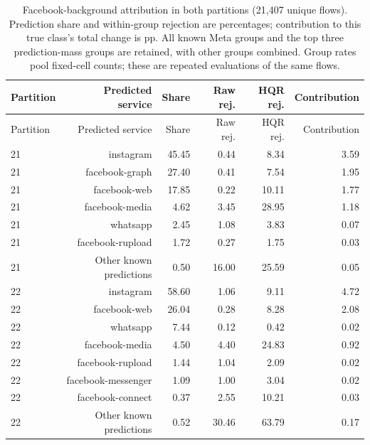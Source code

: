 \begingroup\small\setlength{\tabcolsep}{3pt}
\begin{longtable}{lrrrrr}
\caption{Facebook-background attribution in both partitions (21,407 unique flows). Prediction share and within-group rejection are percentages; contribution to this true class's total change is pp. All known Meta groups and the top three prediction-mass groups are retained, with other groups combined. Group rates pool fixed-cell counts; these are repeated evaluations of the same flows.}\label{tab:final-facebook}\\
\toprule
Partition & Predicted service & Share & Raw rej. & HQR rej. & Contribution\\
\midrule
\endfirsthead
\toprule
Partition & Predicted service & Share & Raw rej. & HQR rej. & Contribution\\
\midrule
\endhead
21 & instagram & 45.45 & 0.44 & 8.34 & 3.59\\
21 & facebook-graph & 27.40 & 0.41 & 7.54 & 1.95\\
21 & facebook-web & 17.85 & 0.22 & 10.11 & 1.77\\
21 & facebook-media & 4.62 & 3.45 & 28.95 & 1.18\\
21 & whatsapp & 2.45 & 1.08 & 3.83 & 0.07\\
21 & facebook-rupload & 1.72 & 0.27 & 1.75 & 0.03\\
21 & Other known predictions & 0.50 & 16.00 & 25.59 & 0.05\\
22 & instagram & 58.60 & 1.06 & 9.11 & 4.72\\
22 & facebook-web & 26.04 & 0.28 & 8.28 & 2.08\\
22 & whatsapp & 7.44 & 0.12 & 0.42 & 0.02\\
22 & facebook-media & 4.50 & 4.40 & 24.83 & 0.92\\
22 & facebook-rupload & 1.44 & 1.04 & 2.09 & 0.02\\
22 & facebook-messenger & 1.09 & 1.00 & 3.04 & 0.02\\
22 & facebook-connect & 0.37 & 2.55 & 10.21 & 0.03\\
22 & Other known predictions & 0.52 & 30.46 & 63.79 & 0.17\\
\bottomrule
\end{longtable}
\endgroup
